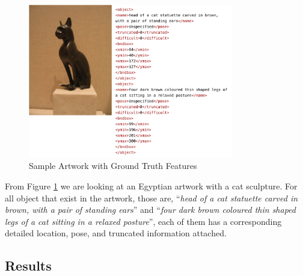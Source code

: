 \begin{figure}[h!]
\centering
\includegraphics[width=0.8\textwidth]{sampledata.pdf}
\caption{Sample Artwork with Ground Truth Features}
\label{fig:sampledata}
\end{figure}

From Figure \ref{fig:sampledata} we are looking at an Egyptian artwork with a cat sculpture. For all object that exist in the artwork, those are, ``\textit{head of a cat statuette carved in brown, with a pair of standing ears}'' and ``\textit{four dark brown coloured thin shaped legs of a cat sitting in a relaxed posture}'', each of them has a corresponding detailed location, pose, and truncated information attached. 



\subsection{Results}


